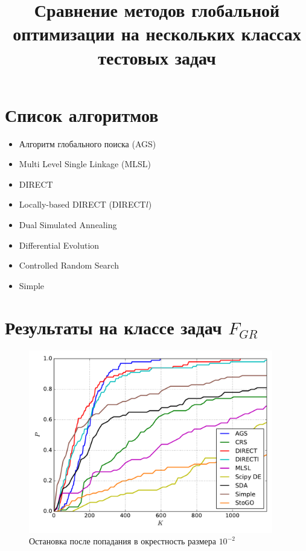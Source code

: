 \documentclass[a4paper]{article}
\begin{document}
\title{Сравнение методов глобальной оптимизации на нескольких классах тестовых задач}
\author{}
\date{}
\maketitle

\section{Список алгоритмов}
\begin{itemize}
  \item Алгоритм глобального поиска (AGS)
  \item Multi Level Single Linkage (MLSL)
  \item DIRECT
  \item Locally-based DIRECT (DIRECT$l$)
  \item Dual Simulated Annealing
  \item Differential Evolution
  \item Controlled Random Search
  \item Simple
\end{itemize}

\section{Результаты на классе задач $F_{GR}$}

\begin{figure}[H]
  \center
  \includegraphics[width=0.95\textwidth]{../experiments/grish/cmc.pdf}
  \caption{Остановка после попадания в окрестность размера $10^{-2}$}
  \label{fig:}
\end{figure}
\end{document}
